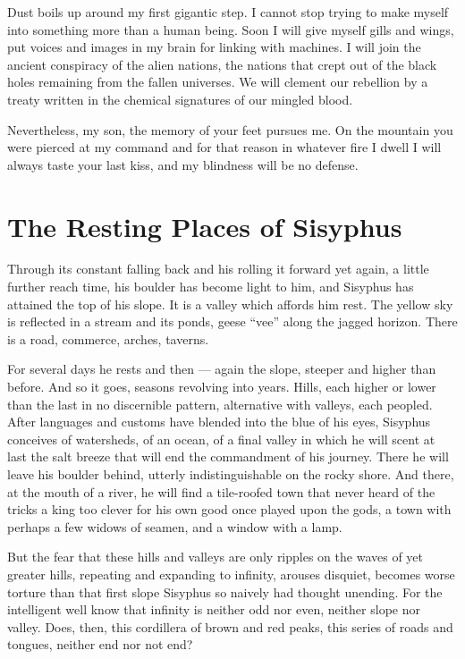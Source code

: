 \documentclass[english,11pt,letterpaper,onecolumn]{scrbook}
\begin{document}
	Dust boils up around my first gigantic step.  I cannot stop trying to make myself into something more than a human being.  Soon I will give myself gills and wings, put voices and images in my brain for linking with machines.  I will join the ancient conspiracy of the alien nations, the nations that crept out of the black holes remaining from the fallen universes.  We will clement our rebellion by a treaty written in the chemical signatures of our mingled blood.

	Nevertheless, my son, the memory of your feet pursues me.  On the mountain you were pierced at my command and for that reason in whatever fire I dwell I will always taste your last kiss, and my blindness will be no defense.

\newpage
\section{The Resting Places of Sisyphus}
	Through its constant falling back and his rolling it forward yet again, a little further reach time, his boulder has become light to him, and Sisyphus has attained the top of his slope.  It is a valley which affords him rest.  The yellow sky is reflected in a stream and its ponds, geese ``vee'' along the jagged horizon.  There is a road, commerce, arches, taverns.

	For several days he rests and then --- again the slope, steeper and higher than before.  And so it goes, seasons revolving into years.  Hills, each higher or lower than the last in no discernible pattern, alternative with valleys, each peopled.  After languages and customs have blended into the blue of his eyes, Sisyphus conceives of watersheds, of an ocean, of a final valley in which he will scent at last the salt breeze that will end the commandment of his journey.  There he will leave his boulder behind, utterly indistinguishable on the rocky shore.  And there, at the mouth of a river, he will find a tile-roofed town that never heard of the tricks a king too clever for his own good once played upon the gods, a town with perhaps a few widows of seamen, and a window with a lamp.

	But the fear that these hills and valleys are only ripples on the waves of yet greater hills, repeating and expanding to infinity, arouses disquiet, becomes worse torture than that first slope Sisyphus so naively had thought unending.  For the intelligent well know that infinity is neither odd nor even, neither slope nor valley.  Does, then, this cordillera of brown and red peaks, this series of roads and tongues, neither end nor not end?
\end{document}
